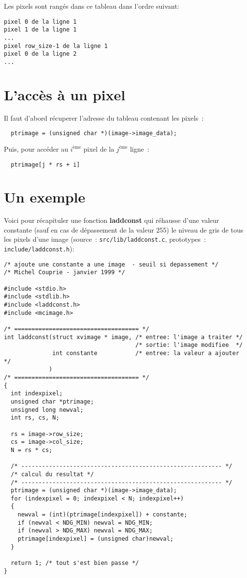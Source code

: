Les pixels sont rang\'es dans ce tableau dans l'ordre
suivant:

\begin{verbatim}
pixel 0 de la ligne 1
pixel 1 de la ligne 1
...
pixel row_size-1 de la ligne 1
pixel 0 de la ligne 2
...
\end{verbatim}

\section{L'acc\`es \`a un pixel}

Il faut d'abord r\'ecuperer l'adresse du tableau contenant les pixels~:

\begin{verbatim}
  ptrimage = (unsigned char *)(image->image_data);
\end{verbatim}

Puis, pour acc\'eder au $i^{\mbox{\`eme}}$ pixel de la
$j^{\mbox{\`eme}}$ ligne~:

\begin{verbatim}
  ptrimage[j * rs + i]
\end{verbatim}

\section{Un exemple}

Voici pour r\'ecapituler une fonction {\bf laddconst} qui 
r\'ehausse d'une valeur constante (sauf en cas de d\'epassement
de la valeur 255) le niveau de gris de tous les pixels d'une
image (source~: \verb|src/lib/laddconst.c|, prototypes~: 
\verb|include/laddconst.h|):

\begin{verbatim}
/* ajoute une constante a une image  - seuil si depassement */
/* Michel Couprie - janvier 1999 */

#include <stdio.h>
#include <stdlib.h>
#include <laddconst.h>
#include <mcimage.h>

/* ==================================== */
int laddconst(struct xvimage * image, /* entree: l'image a traiter */
                                      /* sortie: l'image modifiee  */
              int constante           /* entree: la valeur a ajouter */
             )
/* ==================================== */
{
  int indexpixel;
  unsigned char *ptrimage;
  unsigned long newval;
  int rs, cs, N;

  rs = image->row_size;
  cs = image->col_size;
  N = rs * cs;
  
  /* ---------------------------------------------------------- */
  /* calcul du resultat */
  /* ---------------------------------------------------------- */
  ptrimage = (unsigned char *)(image->image_data);
  for (indexpixel = 0; indexpixel < N; indexpixel++)
  {
    newval = (int)(ptrimage[indexpixel]) + constante;
    if (newval < NDG_MIN) newval = NDG_MIN;
    if (newval > NDG_MAX) newval = NDG_MAX;
    ptrimage[indexpixel] = (unsigned char)newval;
  }

  return 1; /* tout s'est bien passe */
}
\end{verbatim}

